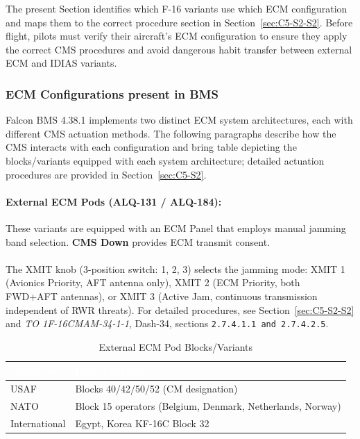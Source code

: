 \documentclass[11pt,a4paper]{article}
\providecommand{\dashrefs}[1]{\textit{TO 1F-16CMAM-34-1-1}, Dash-34, sections \texttt{#1}}
\begin{document}
The present Section identifies which F-16 variants use which ECM configuration and maps them to the correct procedure section in Section~\ref{sec:C5-S2-S2}. Before flight, pilots must verify their aircraft's ECM configuration to ensure they apply the correct CMS procedures and avoid dangerous habit transfer between external ECM and IDIAS variants.


\subsubsection{ECM Configurations present in BMS}\label{sec:C5-S3-S1}

Falcon BMS 4.38.1 implements two distinct ECM system architectures, each with different CMS actuation methods. The following paragraphs describe how the CMS interacts with each configuration and bring table depicting the blocks/variants equipped with each system architecture; detailed actuation procedures are provided in Section~\ref{sec:C5-S2}.

\paragraph{External ECM Pods (ALQ-131 / ALQ-184):}
These variants are equipped with an ECM Panel that employs manual jamming band selection. \textbf{CMS Down} provides ECM transmit consent.\\\\
The XMIT knob (3-position switch: 1, 2, 3) selects the jamming mode: XMIT 1 (Avionics Priority, AFT antenna only), XMIT 2 (ECM Priority, both FWD+AFT antennas), or XMIT 3 (Active Jam, continuous transmission independent of RWR threats). For detailed procedures, see Section~\ref{sec:C5-S2-S2} and \dashrefs{2.7.4.1.1 and 2.7.4.2.5}.

\begin{table}[h]
\centering
\caption{External ECM Pod Blocks/Variants}
\label{tab:C5-S3-external-ecm-pods}
\small
\renewcommand{\arraystretch}{1.25}
\begin{tabular}{|>{\raggedright\arraybackslash}p{3.0cm}|>{\raggedright\arraybackslash}p{5.8cm}|}
\hline
\rowcolor{headerblue}
\textcolor{white}{\textbf{Operator}} & \textcolor{white}{\textbf{Block/Variant}} \\
\hline
USAF & Blocks 40/42/50/52 (CM designation) \\
\hline
NATO & Block 15 operators (Belgium, Denmark, Netherlands, Norway) \\
\hline
International & Egypt, Korea KF-16C Block 32 \\
\hline
\end{tabular}
\end{table}
\end{document}
